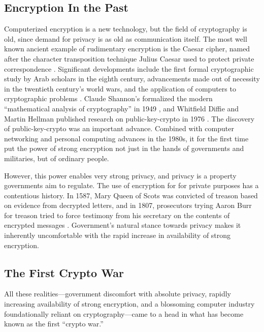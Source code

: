 \subsection{Encryption In the Past}
\label{sec-history-old}

Computerized encryption is a new technology, but the field of cryptography is old, since demand for privacy is as old as
communication itself. The most well known ancient example of rudimentary encryption is the Caesar cipher, named after
the character transposition technique Julius Caesar used to protect private correspondence
\cite{luciano_cryptology_1987}. Significant developments include the first formal cryptographic study by Arab scholars
in the eighth century, advancements made out of necessity in the twentieth century's world wars, and the application of
computers to cryptographic problems \cite{kahn_codebreakers_1996}. Claude Shannon's formalized the modern ``mathematical
analysis of cryptography'' in 1949 \cite{shannon_communication_1949}, and Whitfield Diffie and Martin Hellman published
research on \ac{public-key-crypto} in 1976 \cite{diffie_new_1976}. The discovery of \ac{public-key-crypto} was an
important advance. Combined with computer networking and personal computing advances in the 1980s, it for the first time
put the power of strong encryption not just in the hands of governments and militaries, but of ordinary people.

However, this power enables very strong privacy, and privacy is a property governments aim to regulate. The use of
encryption for for private purposes has a contentious history. In 1587, Mary Queen of Scots was convicted of treason
based on evidence from decrypted letters, and in 1807, prosecutors trying Aaron Burr for treason tried to force
testimony from his secretary on the contents of encrypted messages \cite{kerr_encryption_2017}. Government's natural
stance towards privacy makes it inherently uncomfortable with the rapid increase in availability of strong encryption.


\subsection{The First Crypto War}
\label{sec-history-cw1}

All these realities---government discomfort with absolute privacy, rapidly increasing availability of strong encryption,
and a blossoming computer industry foundationally reliant on cryptography---came to a head in what has become known as
the first ``crypto war.''

